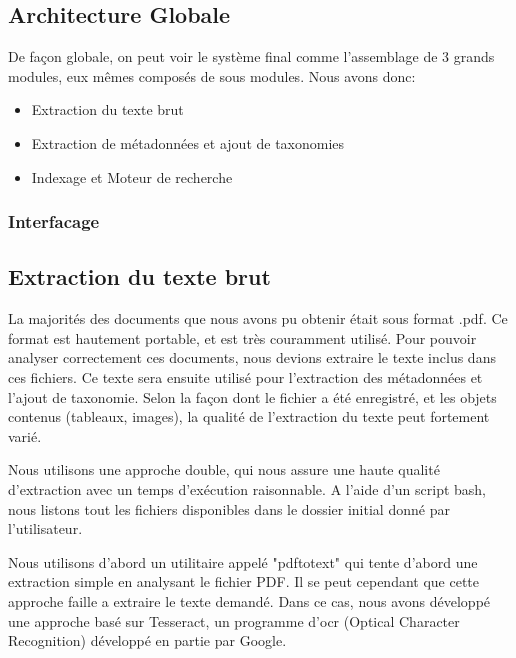 

\subsection{Architecture Globale}
De façon globale, on peut voir le système final comme l'assemblage de 3 grands modules, eux mêmes composés de sous modules. 
Nous avons donc:
\begin{itemize}
	\item Extraction du texte brut
	\item Extraction de métadonnées et ajout de taxonomies
	\item Indexage et Moteur de recherche
\end{itemize}

\subsubsection{Interfacage}

\subsection{Extraction du texte brut}
La majorités des documents que nous avons pu obtenir était sous format .pdf.
Ce format est hautement portable, et est très couramment utilisé.
Pour pouvoir analyser correctement ces documents, nous devions extraire le texte inclus dans ces fichiers.
Ce texte sera ensuite utilisé pour l'extraction des métadonnées et l'ajout de taxonomie. Selon la façon dont le fichier a été enregistré, et les objets contenus (tableaux, images), la qualité de l'extraction du texte peut fortement varié. 

Nous utilisons une approche double, qui nous assure une haute qualité d'extraction avec un temps d'exécution raisonnable.
A l'aide d'un script bash, nous listons tout les fichiers disponibles dans le dossier initial donné par l'utilisateur. 

Nous utilisons d'abord un utilitaire appelé "pdftotext" qui tente d'abord une extraction simple en analysant le fichier PDF. Il se peut cependant que cette approche faille a extraire le texte demandé. Dans ce cas, nous avons développé une approche basé sur Tesseract\cite{tess}, un programme d'\gls{ocr} (Optical Character Recognition) développé en partie par Google. 

